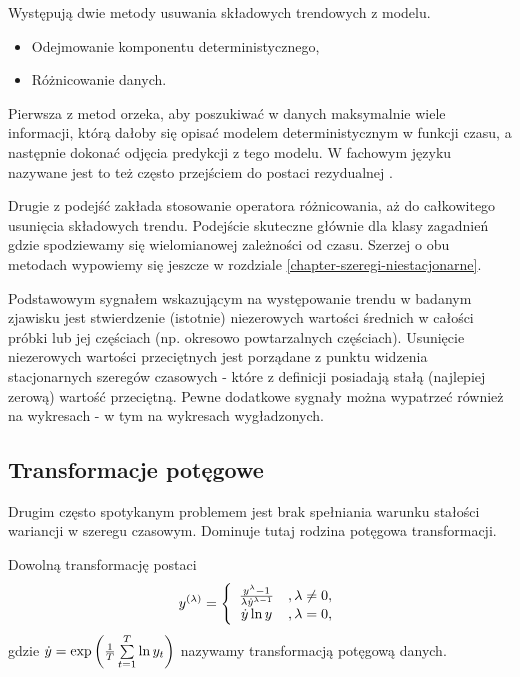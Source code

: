 \documentclass[10pt,a4paper]{book}
\begin{document}
Występują dwie metody usuwania składowych trendowych z modelu. 
\begin{itemize}
\item Odejmowanie komponentu deterministycznego,
\item Różnicowanie danych.
\end{itemize}

Pierwsza z metod orzeka, aby poszukiwać w danych maksymalnie wiele informacji, którą dałoby się opisać modelem deterministycznym w funkcji czasu, a następnie dokonać odjęcia predykcji z tego modelu. W fachowym języku nazywane jest to też często przejściem do postaci rezydualnej .

Drugie z podejść zakłada stosowanie operatora różnicowania, aż do całkowitego usunięcia składowych trendu. Podejście skuteczne głównie dla klasy zagadnień gdzie spodziewamy się wielomianowej zależności od czasu. Szerzej o obu metodach wypowiemy się jeszcze w rozdziale \ref{chapter-szeregi-niestacjonarne}.

Podstawowym sygnałem wskazującym na występowanie trendu w badanym zjawisku jest stwierdzenie (istotnie) niezerowych wartości średnich w całości próbki lub jej częściach (np. okresowo powtarzalnych częściach). Usunięcie niezerowych wartości przeciętnych jest porządane z punktu widzenia stacjonarnych szeregów czasowych - które z definicji posiadają stałą (najlepiej zerową) wartość przeciętną. Pewne dodatkowe sygnały można wypatrzeć również na wykresach - w tym na wykresach wygładzonych.


\subsection{Transformacje potęgowe}

Drugim często spotykanym problemem jest brak spełniania warunku stałości wariancji w szeregu czasowym. Dominuje tutaj rodzina potęgowa transformacji.

\begin{definition}
Dowolną transformację postaci
$$
y^{(\lambda)} = \left \lbrace 
\begin{array}{c l}
\frac{y^\lambda - 1}{\lambda \dot{y}^{\lambda -1} }&, \lambda \neq 0,\\
\dot{y} \ln y&, \lambda =0,
\end{array}
 \right.
$$ 
gdzie $\dot{y} = \function{\exp}{\frac{1}{T} \sum_{t=1}^{T}  \ln y_t}$
nazywamy transformacją potęgową danych.
\end{definition}
\end{document}
